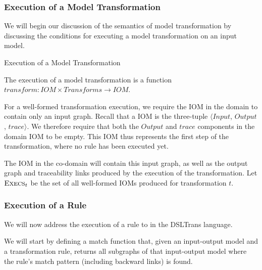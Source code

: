 \subsubsection*{Execution of a Model Transformation}

We will begin our discussion of the semantics of model transformation by discussing the conditions for executing a model transformation on an input model.


\begin{definition} {Execution of a Model Transformation\\}
\label{def:modeltransformation} 

The execution of a model transformation is a function $transform: IOM \times Transforms \rightarrow IOM$.

\end{definition}

For a well-formed transformation execution, we require the IOM in the domain to contain only an input graph. Recall that a IOM is the three-tuple $\big\langle \mathit{Input}$, $\mathit{Output}$, $\mathit{trace}\big\rangle$. We therefore require that both the $\mathit{Output}$ and $\mathit{trace}$ components in the domain IOM to be empty. This IOM thus represents the first step of the transformation, where no rule has been executed yet.

The IOM in the co-domain will contain this input graph, as well as the output graph and traceability links produced by the execution of the transformation. Let $\textsc{Execs}_t$ be the set of all well-formed IOMs produced for transformation $t$.


\subsubsection*{Execution of a Rule}

We will now address the execution of a rule to in the DSLTrans language. 



We will start by defining a match function that, given an input-output model and a transformation rule, returns all subgraphs of that input-output model where the rule's match pattern (including backward links) is found.  


